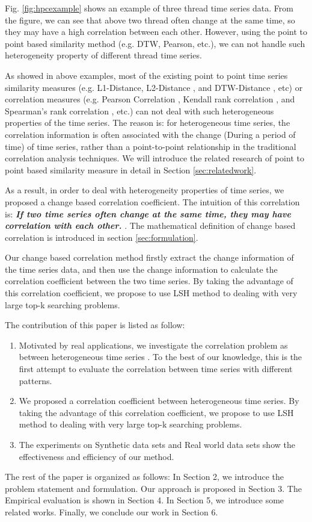 Fig. \ref{fig:hpcexample} shows an example of three thread time series data. From the figure, we can see that above two thread often change at the same time, so they may have a high correlation between each other. However, using the point to point based similarity method (e.g. DTW, Pearson, etc.), we can not handle such heterogeneity property of different thread time series.

As showed in above examples, most of the existing point to point time series similarity measures (e.g. L1-Distance, L2-Distance \cite{han2011data}, and DTW-Distance \cite{muller2007dynamic}, etc) or correlation measures (e.g. Pearson Correlation \cite{pearson1904mathematical}, Kendall rank correlation \cite{kendall1938new}, and Spearman's rank correlation \cite{pirie1988spearman}, etc.) can not deal with such heterogeneous properties of the time series. 
The reason is: for heterogeneous time series, the correlation information is often associated with the change (During a period of time) of time series, rather than a point-to-point relationship in the traditional correlation analysis techniques. We will introduce the related research of point to point based similarity measure in detail in Section \ref{sec:relatedwork}.

As a result, in order to deal with heterogeneity properties of time series, we proposed a change based correlation coefficient. 
The intuition of this correlation is: 
\textbf{\textit{If two time series often change at the same time, they may have correlation with each other.} }. The mathematical definition of change based correlation is introduced in section \ref{sec:formulation}. 

Our change based correlation method firstly extract the change information of the time series data, and then use the change information to calculate the correlation coefficient between the two time series.
By taking the advantage of this correlation coefficient, we propose to use LSH method to dealing with very large top-k searching problems.

The contribution of this paper is listed as follow:
\begin{enumerate}
\item Motivated by real applications, we investigate the correlation
problem as between heterogeneous time series .
To the best of our knowledge, this is the first attempt
to evaluate the correlation between time series with different patterns.

\item We proposed a correlation coefficient between heterogeneous time series. By taking the advantage of this correlation coefficient, we propose to use LSH method to dealing with very large top-k searching problems.

\item The experiments on Synthetic data sets and Real world data sets show the effectiveness and efficiency of our method.
\end{enumerate}

The rest of the paper is organized as follows: In Section 2, we introduce the problem
statement and formulation. Our approach is proposed in Section 3. The Empirical evaluation is shown in Section 4. In Section 5, we introduce some
related works. Finally, we conclude our work in Section 6.



